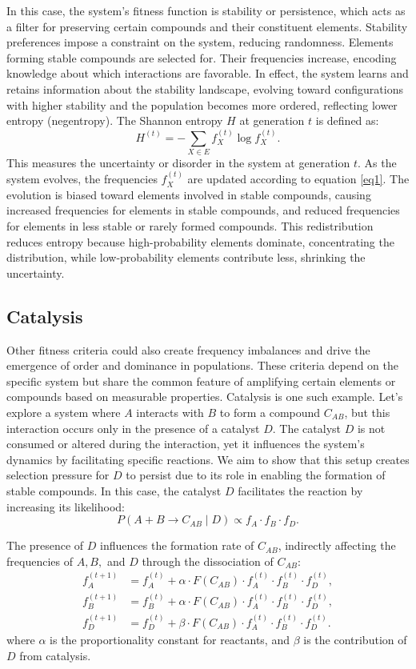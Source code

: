 \documentclass[entropy,article,submit,pdftex,moreauthors]{Definitions/mdpi}
\begin{document}
In this case, the system’s fitness function is stability or persistence, which acts as a filter for preserving certain compounds and their constituent elements. Stability preferences impose a constraint on the system, reducing randomness. Elements forming stable compounds are selected for. Their frequencies increase, encoding knowledge about which interactions are favorable. In effect, the system learns and retains information about the stability landscape, evolving toward configurations with higher stability and the population becomes more ordered, reflecting lower entropy (negentropy). The Shannon entropy \( H \) at generation \( t \) is defined as:
\[
H^{(t)} = -\sum_{X \in E} f_X^{(t)} \log f_X^{(t)}.
\]
This measures the uncertainty or disorder in the system at generation \( t \). As the system evolves, the frequencies \( f_X^{(t)} \) are updated according to equation \eqref{eq1}. The evolution is biased toward elements involved in stable compounds, causing increased frequencies for elements in stable compounds, and reduced frequencies for elements in less stable or rarely formed compounds. This redistribution reduces entropy because high-probability elements dominate, concentrating the distribution, while low-probability elements contribute less, shrinking the uncertainty.

\subsection{Catalysis}

Other fitness criteria could also create frequency imbalances and drive the emergence of order and dominance in populations. These criteria depend on the specific system but share the common feature of amplifying certain elements or compounds based on measurable properties. Catalysis is one such example. Let's explore a system where \( A \) interacts with \( B \) to form a compound \( C_{AB} \), but this interaction occurs only in the presence of a catalyst \( D \). The catalyst \( D \) is not consumed or altered during the interaction, yet it influences the system's dynamics by facilitating specific reactions. We aim to show that this setup creates selection pressure for \( D \) to persist due to its role in enabling the formation of stable compounds. In this case, the catalyst \( D \) facilitates the reaction by increasing its likelihood:
\[
P(A + B \to C_{AB} \mid D) \propto f_A \cdot f_B \cdot f_D.
\]

The presence of \( D \) influences the formation rate of \( C_{AB} \), indirectly affecting the frequencies of \( A, B, \) and \( D \) through the dissociation of \( C_{AB} \):
\begin{align*}
f_A^{(t+1)} &= f_A^{(t)} + \alpha \cdot F(C_{AB}) \cdot f_A^{(t)} \cdot f_B^{(t)} \cdot f_D^{(t)}, \\
f_B^{(t+1)} &= f_B^{(t)} + \alpha \cdot F(C_{AB}) \cdot f_A^{(t)} \cdot f_B^{(t)} \cdot f_D^{(t)}, \\
f_D^{(t+1)} &= f_D^{(t)} + \beta \cdot F(C_{AB}) \cdot f_A^{(t)} \cdot f_B^{(t)} \cdot f_D^{(t)}.
\end{align*}
where \( \alpha \) is the proportionality constant for reactants, and \( \beta \) is the contribution of \( D \) from catalysis.
\end{document}
